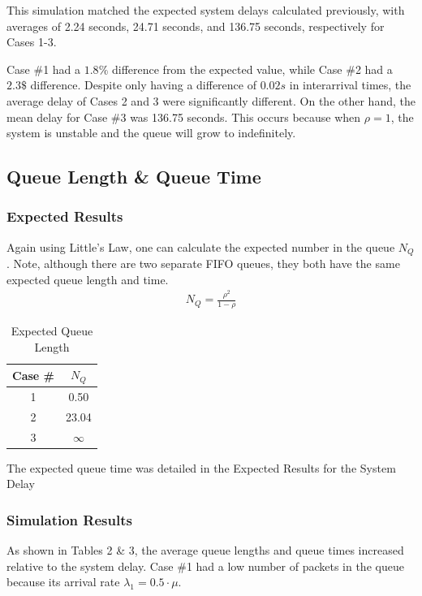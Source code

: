 \documentclass{article}
\begin{document}
This simulation matched the expected system delays calculated previously, with averages of 2.24 seconds, 24.71 seconds, and 136.75 seconds, respectively for Cases 1-3.

Case \#1 had a $1.8\%$ difference from the expected value, while Case \#2 had a $2.3\$$ difference.
Despite only having a difference of $0.02s$ in interarrival times, the average delay of Cases 2 and 3 were significantly different. 
On the other hand, the mean delay for Case \#3 was 136.75 seconds.  
This occurs because when $\rho = 1$, the system is unstable and the queue will grow to indefinitely.

\subsection*{Queue Length \& Queue Time}

\subsubsection*{Expected Results}
Again using Little's Law, one can calculate the expected number in the queue $N_Q$.
Note, although there are two separate FIFO queues, they both have the same expected queue length and time.
\begin{align*}
N_Q = \frac{\rho^2}{1-\rho}
\end{align*}

\begin{table}[h!]
\centering
\begin{tabular}{|c|c|} \hline
\textbf{Case \#} & $N_Q$ \\ \hline
1 & 0.50  \\ \hline
2 & 23.04 \\ \hline
3 & $\infty$  \\ \hline 
\end{tabular}
\caption{Expected Queue Length}
\label{tab:expectQlen}
\end{table}

The expected queue time was detailed in the Expected Results for the System Delay
\subsubsection*{Simulation Results}
As shown in Tables 2 \& 3, the average queue lengths and queue times increased relative to the system delay.  
Case \#1 had a low number of packets in the queue because its arrival rate $\lambda_1 = 0.5 \cdot \mu$.
\end{document}
